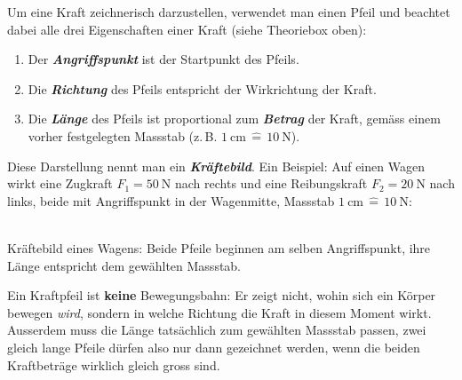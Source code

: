 \documentclass[addpoints,11pt,a4paper]{exam}
\begin{document}
\begin{theoriebox}
Um eine Kraft zeichnerisch darzustellen, verwendet man einen Pfeil und
beachtet dabei alle drei Eigenschaften einer Kraft (siehe Theoriebox oben):

\begin{enumerate}[leftmargin=1.2cm,itemsep=0.25em]
  \item Der \textbf{\emph{Angriffspunkt}} ist der Startpunkt des Pfeils.
  \item Die \textbf{\emph{Richtung}} des Pfeils entspricht der
  Wirkrichtung der Kraft.
  \item Die \textbf{\emph{Länge}} des Pfeils ist proportional zum
  \textbf{\emph{Betrag}} der Kraft, gemäss einem vorher festgelegten
  Massstab (z.\,B. $\SI{1}{\centi\meter} \,\widehat{=}\, \SI{10}{\newton}$).
\end{enumerate}

Diese Darstellung nennt man ein \textbf{\emph{Kräftebild}}. Ein Beispiel:
Auf einen Wagen wirkt eine Zugkraft $F_1=\SI{50}{\newton}$ nach rechts und
eine Reibungskraft $F_2=\SI{20}{\newton}$ nach links, beide mit
Angriffspunkt in der Wagenmitte, Massstab
$\SI{1}{\centi\meter}\,\widehat{=}\,\SI{10}{\newton}$:

\begin{center}
\\[0.2em]
{\scriptsize Kräftebild eines Wagens: Beide Pfeile beginnen am selben
Angriffspunkt, ihre Länge entspricht dem gewählten Massstab.}
\end{center}
\end{theoriebox}

\begin{hinweisbox}
Ein Kraftpfeil ist \textbf{keine} Bewegungsbahn: Er zeigt nicht, wohin sich
ein Körper bewegen \emph{wird}, sondern in welche Richtung die Kraft in
diesem Moment wirkt. Ausserdem muss die Länge tatsächlich zum gewählten
Massstab passen, zwei gleich lange Pfeile dürfen also nur dann gezeichnet
werden, wenn die beiden Kraftbeträge wirklich gleich gross sind.
\end{hinweisbox}
\end{document}
